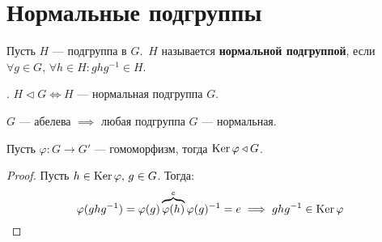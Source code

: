 \documentclass[../main.tex]{subfiles}
\begin{document}
\section{Нормальные подгруппы}
\begin{definition}
    Пусть $H$ --- подгруппа в $G$.\, $H$ называется \textbf{нормальной подгруппой}, если $\forall g \in G, \, \forall h \in H\colon ghg^{-1} \in H$.
\end{definition}
. $H \triangleleft G \iff H$ --- нормальная подгруппа $G$.
\begin{remark}
    $G$ --- абелева $\implies$ любая подгруппа $G$ --- нормальная.
\end{remark}

\begin{theorem-non}
    Пусть $\varphi\colon G \to G'$ --- гомоморфизм, тогда $\operatorname{Ker} \varphi \triangleleft G$.
\end{theorem-non}
\begin{proof}
    Пусть $h \in \operatorname{Ker} \varphi, \, g \in G$. Тогда:
    \begin{equation*}
        \varphi(ghg^{-1}) = \varphi(g) \overbrace{\varphi(h)}^{\mathclap{e}} \varphi(g)^{-1} = e
        \implies ghg^{-1} \in \Ker \varphi
    \end{equation*}
\end{proof}
\end{document}
